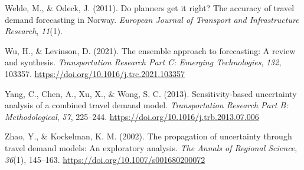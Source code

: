 \documentclass[
  letterpaper,
  number,
  review,
  3p]{elsarticle}
\newlength{\cslhangindent}
\newenvironment{CSLReferences}[2] %
 {\begin{list}{}{%
  \setlength{\itemindent}{0pt}
  \setlength{\leftmargin}{0pt}
  \setlength{\parsep}{0pt}
  \ifodd #1
   \setlength{\leftmargin}{\cslhangindent}
   \setlength{\itemindent}{-1\cslhangindent}
  \fi
  \setlength{\itemsep}{#2\baselineskip}}}
 {\end{list}}
\begin{document}
\begin{CSLReferences}{1}{0}
Welde, M., \& Odeck, J. (2011). Do planners get it right? {The} accuracy
of travel demand forecasting in {Norway}. \emph{European Journal of
Transport and Infrastructure Research}, \emph{11}(1).

Wu, H., \& Levinson, D. (2021). The ensemble approach to forecasting:
{A} review and synthesis. \emph{Transportation Research Part C: Emerging
Technologies}, \emph{132}, 103357.
\url{https://doi.org/10.1016/j.trc.2021.103357}

Yang, C., Chen, A., Xu, X., \& Wong, S. C. (2013). Sensitivity-based
uncertainty analysis of a combined travel demand model.
\emph{Transportation Research Part B: Methodological}, \emph{57},
225--244. \url{https://doi.org/10.1016/j.trb.2013.07.006}

Zhao, Y., \& Kockelman, K. M. (2002). The propagation of uncertainty
through travel demand models: {An} exploratory analysis. \emph{The
Annals of Regional Science}, \emph{36}(1), 145--163.
\url{https://doi.org/10.1007/s001680200072}

\end{CSLReferences}
\end{document}

